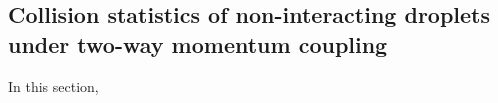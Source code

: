 \documentclass[../thesis.tex]{subfiles}
\begin{document}
\subsection{Collision statistics of non-interacting droplets under two-way momentum coupling\label{sec:2way}}
In this section, 


%
%
\newpage
\end{document}
